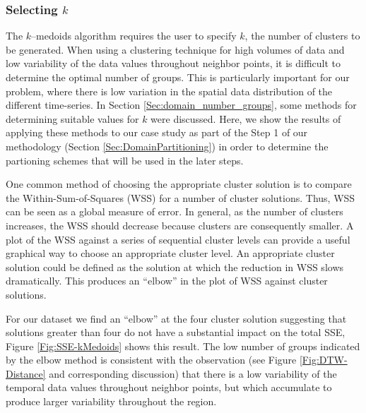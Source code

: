 

\subsubsection{Selecting $k$}
\label{Sec:Selectk}

The $k$--medoids algorithm requires the user to specify $k$, the number of clusters to be generated. When using a clustering technique for high volumes of data and low variability of the data values throughout neighbor points, it is difficult to determine the optimal number of groups. This is particularly important for our problem, where there is low variation in the spatial data distribution of the different time-series. In Section \ref{Sec:domain_number_groups}, some methods for determining suitable values for $k$ were discussed. Here, we show the results of applying these methods to our case study as part of the Step 1 of our methodology (Section \ref{Sec:DomainPartitioning}) in order to determine the partioning schemes that will be used in the later steps.

One common method of choosing the appropriate cluster solution is to compare the Within-Sum-of-Squares (WSS) for a number of cluster solutions. Thus, WSS can be seen as a global measure of error. In general, as the number of clusters increases, the WSS should decrease because clusters are consequently smaller. A plot of the WSS against a series of sequential cluster levels can provide a useful graphical way to choose an appropriate cluster level. An appropriate cluster solution could be defined as the solution at which the reduction in WSS slows dramatically. This produces an ``elbow'' in the plot of WSS against cluster solutions. 

For our dataset we find an ``elbow'' at the four cluster solution suggesting that solutions greater than four do not have a substantial impact on the total SSE, Figure \ref{Fig:SSE-kMedoids} shows this result. The low number of groups indicated by the elbow method is consistent with the observation (see Figure 
\ref{Fig:DTW-Distance} and corresponding discussion) that there is a low variability of the temporal data values throughout neighbor points, but which accumulate to produce larger variability throughout the region.

